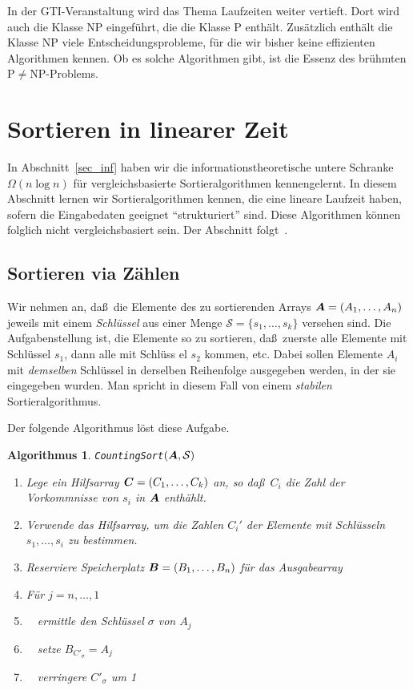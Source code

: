 \documentclass[10pt,reqno]{amsart}
\numberwithin{equation}{section}
\newcommand\cS{\mathcal S}
\newcommand\vA{\vec A}
\newcommand\vB{\vec B}
\newcommand\vC{\vec C}
\def\vec#1{\mathchoice{\mbox{\boldmath$\displaystyle#1$}}
{\mbox{\boldmath$\textstyle#1$}}
{\mbox{\boldmath$\scriptstyle#1$}}
{\mbox{\boldmath$\scriptscriptstyle#1$}}}
\newtheorem{algorithm}[definition]{Algorithmus}
\begin{document}
In der GTI-Veranstaltung wird das Thema Laufzeiten weiter vertieft.
Dort wird auch die Klasse NP eingef\"uhrt, die die Klasse P enth\"alt.
Zus\"atzlich enth\"alt die Klasse NP viele Entscheidungsprobleme, f\"ur die wir bisher keine effizienten Algorithmen kennen.
Ob es solche Algorithmen gibt, ist die Essenz des br\"uhmten P$\neq$NP-Problems.

\section{Sortieren in linearer Zeit}\label{sec_radix}

\noindent
In Abschnitt~\ref{sec_inf} haben wir die informationstheoretische untere Schranke $\Omega(n\log n)$ f\"ur vergleichsbasierte Sortieralgorithmen kennengelernt.
In diesem Abschnitt lernen wir Sortieralgorithmen kennen, die eine lineare Laufzeit haben, sofern die Eingabedaten geeignet ``strukturiert'' sind.
Diese Algorithmen k\"onnen folglich nicht vergleichsbasiert sein.
Der Abschnitt folgt~\cite{Cormen}.

\subsection{Sortieren via Z\"ahlen}\label{sec_counting}
Wir nehmen an, da\ss\ die Elemente des zu sortierenden Arrays $\vA=(A_1,\ldots,A_n)$ jeweils mit einem \emph{Schl\"ussel} aus einer Menge $\cS=\{s_1,\ldots,s_k\}$ versehen sind.
Die Aufgabenstellung ist, die Elemente so zu sortieren, da\ss\ zuerste alle Elemente mit Schl\"ussel $s_1$, dann alle mit Schl\"uss el $s_2$ kommen, etc.
Dabei sollen Elemente $A_i$ mit {\em demselben} Schl\"ussel in derselben Reihenfolge ausgegeben werden, in der sie eingegeben wurden.
Man spricht in diesem Fall von einem \emph{stabilen} Sortieralgorithmus.

Der folgende Algorithmus l\"ost diese Aufgabe.

\begin{algorithm}{\tt CountingSort$(\vA,\cS)$}
	\begin{enumerate}
		\item Lege ein Hilfsarray $\vC=(C_1,\ldots,C_k)$ an, so da\ss\ $C_i$ die Zahl der Vorkommnisse von $s_i$ in $\vA$ enth\"ahlt.
		\item Verwende das Hilfsarray, um die Zahlen $C_i'$ der Elemente mit Schl\"usseln $s_1,\ldots,s_i$ zu bestimmen.
		\item Reserviere Speicherplatz $\vB=(B_1,\ldots,B_n)$ f\"ur das Ausgabearray
		\item F\"ur $j=n,\ldots,1$
		\item $\quad$ermittle den Schl\"ussel $\sigma$ von $A_j$
		\item $\quad$setze $B_{C'_\sigma}=A_j$
		\item $\quad$verringere $C'_\sigma$ um 1
	\end{enumerate}
\end{algorithm}
\end{document}
